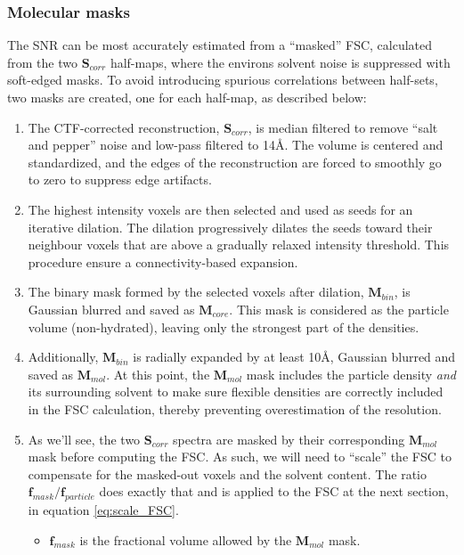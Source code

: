 \subsubsection{Molecular masks} \label{sec:algo:avg:molecular_mask}

The SNR can be most accurately estimated from a ``masked'' FSC, calculated from the two $\bm{S}_{corr}$ half-maps, where the environs solvent noise is suppressed with soft-edged masks. To avoid introducing spurious correlations between half-sets, two masks are created, one for each half-map, as described below:
\begin{enumerate}
    \item The CTF-corrected reconstruction, $\bm{S}_{corr}$, is median filtered to remove ``salt and pepper'' noise and low-pass filtered to 14\r{A}. The volume is centered and standardized, and the edges of the reconstruction are forced to smoothly go to zero to suppress edge artifacts.
    \item The highest intensity voxels are then selected and used as seeds for an iterative dilation. The dilation progressively dilates the seeds toward their neighbour voxels that are above a gradually relaxed intensity threshold. This procedure ensure a connectivity-based expansion.
    \item The binary mask formed by the selected voxels after dilation, $\bm{M}_{bin}$, is Gaussian blurred and saved as $\bm{M}_{core}$. This mask is considered as the particle volume (non-hydrated), leaving only the strongest part of the densities.
    \item Additionally, $\bm{M}_{bin}$ is radially expanded by at least 10\r{A}, Gaussian blurred and saved as $\bm{M}_{mol}$. At this point, the $\bm{M}_{mol}$ mask includes the particle density \emph{and} its surrounding solvent to make sure flexible densities are correctly included in the FSC calculation, thereby preventing overestimation of the resolution.
    \item As we'll see, the two $\bm{S}_{corr}$ spectra are masked by their corresponding $\bm{M}_{mol}$ mask before computing the FSC. As such, we will need to ``scale'' the FSC to compensate for the masked-out voxels and the solvent content. The ratio $\bm{f}_{mask} / \bm{f}_{particle}$ does exactly that and is applied to the FSC at the next section, in equation \ref{eq:scale_FSC}.
    \begin{itemize}
        \item $\bm{f}_{mask}$ is the fractional volume allowed by the $\bm{M}_{mol}$ mask.

\end{itemize}
\end{enumerate}
